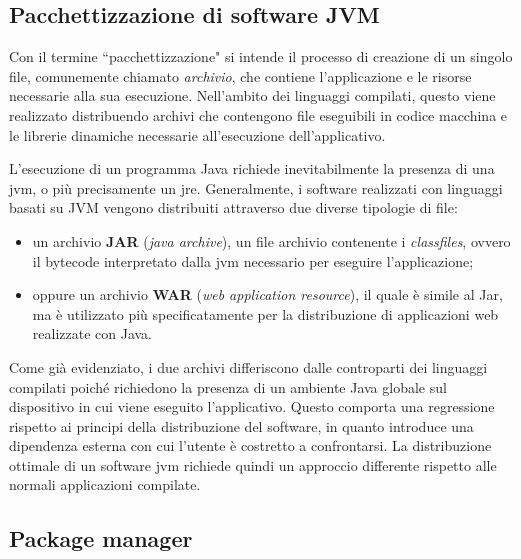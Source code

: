 \subsection{Pacchettizzazione di software JVM}
Con il termine ``pacchettizzazione" si intende il processo di creazione di un singolo file, comunemente chiamato \textit{archivio}, che contiene l'applicazione e le risorse necessarie alla sua esecuzione. Nell'ambito dei linguaggi compilati, questo viene realizzato distribuendo archivi che contengono file eseguibili in codice macchina e le librerie dinamiche necessarie all'esecuzione dell'applicativo.

L'esecuzione di un programma Java richiede inevitabilmente la presenza di una \ac{jvm}, o più precisamente un \ac{jre}. Generalmente, i software realizzati con linguaggi basati su JVM vengono distribuiti attraverso due diverse tipologie di file:
\begin{itemize}
	\item un archivio \textbf{JAR} (\textit{java archive}), un file archivio contenente i \textit{classfiles}, ovvero il bytecode interpretato dalla \ac{jvm} necessario per eseguire l'applicazione;
	\item oppure un archivio \textbf{WAR} (\textit{web application resource}), il quale è simile al Jar, ma è utilizzato più specificatamente per la distribuzione di applicazioni web realizzate con Java.
\end{itemize}
Come già evidenziato, i due archivi differiscono dalle controparti dei linguaggi compilati poiché richiedono la presenza di un ambiente Java globale sul dispositivo in cui viene eseguito l'applicativo. Questo comporta una regressione rispetto ai principi della distribuzione del software, in quanto introduce una dipendenza esterna con cui l'utente è costretto a confrontarsi. La distribuzione ottimale di un software \ac{jvm} richiede quindi un approccio differente rispetto alle normali applicazioni compilate.

\subsection{Package manager}

